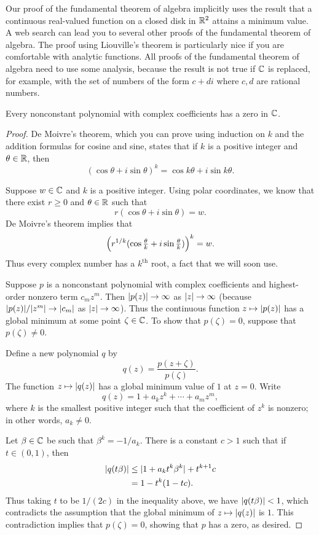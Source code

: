 Our proof of the fundamental theorem of algebra implicitly uses the result that
a continuous real-valued function on a closed disk in $\mathbb{R}^2$ attains a minimum
value. A web search can lead you to several other proofs of the fundamental
theorem of algebra. The proof using Liouville's theorem is particularly nice if
you are comfortable with analytic functions. All proofs of the fundamental
theorem of algebra need to use some analysis, because the result is not true if
$\mathbb{C}$ is replaced, for example, with the set of numbers of the form $c+di$ where
$c,d$ are rational numbers.

\begin{result}\label{ax:4.12}
Every nonconstant polynomial with complex coefficients has a zero in $\mathbb{C}$.
\end{result}

\begin{proof}
De Moivre's theorem, which you can prove using induction on $k$ and the
addition formulas for cosine and sine, states that if $k$ is a positive integer
and $\theta\in\mathbb{R}$, then
\[ (\cos\theta+i\sin\theta)^k = \cos k\theta+i\sin k\theta. \]

Suppose $w\in\mathbb{C}$ and $k$ is a positive integer. Using polar coordinates, we
know that there exist $r\ge0$ and $\theta\in\mathbb{R}$ such that
\[ r(\cos\theta+i\sin\theta) = w. \]
De Moivre's theorem implies that
\[ \Bigl(r^{1/k}(\cos\tfrac{\theta}{k}+i\sin\tfrac{\theta}{k})
   \Bigr)^{k} = w. \]
Thus every complex number has a $k^{\text{th}}$ root, a fact that we will soon
use.

Suppose $p$ is a nonconstant polynomial with complex coefficients and
highest-order nonzero term $c_mz^m$. Then $\lvert p(z) \rvert\to\infty$ as
$\lvert z \rvert\to\infty$ (because $\lvert p(z) \rvert/\lvert z^m \rvert\to\lvert c_m \rvert$ as
$\lvert z \rvert\to\infty$). Thus the continuous function $z\mapsto\lvert p(z) \rvert$ has a
global minimum at some point $\zeta\in\mathbb{C}$. To show that $p(\zeta)=0$, suppose
that $p(\zeta)\ne0$.

Define a new polynomial $q$ by
\[ q(z) = \frac{p(z+\zeta)}{p(\zeta)}. \]
The function $z\mapsto\lvert q(z) \rvert$ has a global minimum value of $1$ at $z=0$.
Write
\[ q(z) = 1+a_kz^k+\cdots+a_mz^m, \]
where $k$ is the smallest positive integer such that the coefficient of $z^k$
is nonzero; in other words, $a_k\ne0$.

Let $\beta\in\mathbb{C}$ be such that $\beta^k=-1/a_k$. There is a constant
$c>1$ such that if $t\in(0,1)$, then
\begin{align*}
\lvert q(t\beta) \rvert &\le \lvert 1+a_kt^k\beta^k \rvert+t^{k+1}c\\
  &= 1-t^k(1-tc).
\end{align*}
Thus taking $t$ to be $1/(2c)$ in the inequality above, we have
$\lvert q(t\beta) \rvert<1$, which contradicts the assumption that the global minimum
of $z\mapsto\lvert q(z) \rvert$ is $1$. This contradiction implies that $p(\zeta)=0$,
showing that $p$ has a zero, as desired.
\end{proof}

